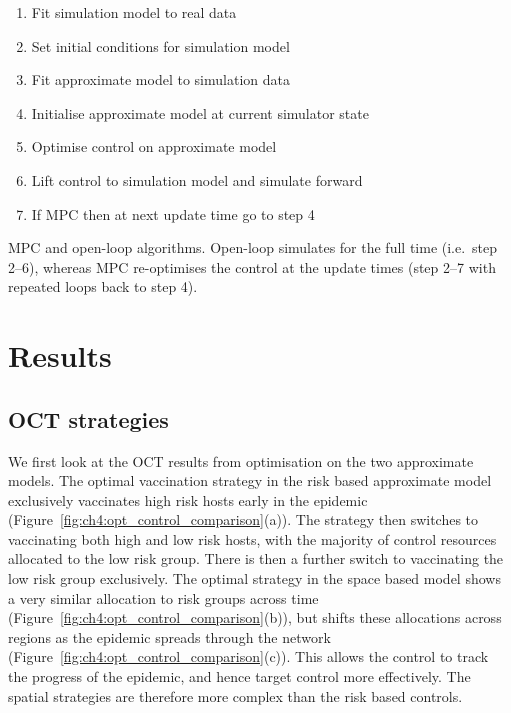 \begin{algorithm}
    \begin{enumerate}
        \item{}Fit simulation model to real data
        \item{}Set initial conditions for simulation model
        \item{}Fit approximate model to simulation data
        \item{}Initialise approximate model at current simulator state
        \item{}Optimise control on approximate model
        \item{}Lift control to simulation model and simulate forward
        \item{}If MPC then at next update time go to step 4
    \end{enumerate}
\caption{MPC and open-loop algorithms. Open-loop simulates for the full time (i.e.\ step 2--6), whereas MPC re-optimises the control at the update times (step 2--7 with repeated loops back to step 4).\label{alg:ch4:ol_mpc}}
\end{algorithm}

\FloatBarrier
\newpage
\section{Results\label{sec:ch4:Results}}

\subsection{OCT strategies}

We first look at the OCT results from optimisation on the two approximate models. The optimal vaccination strategy in the risk based approximate model exclusively vaccinates high risk hosts early in the epidemic (Figure~\ref{fig:ch4:opt_control_comparison}(a)). The strategy then switches to vaccinating both high and low risk hosts, with the majority of control resources allocated to the low risk group. There is then a further switch to vaccinating the low risk group exclusively. The optimal strategy in the space based model shows a very similar allocation to risk groups across time (Figure~\ref{fig:ch4:opt_control_comparison}(b)), but shifts these allocations across regions as the epidemic spreads through the network (Figure~\ref{fig:ch4:opt_control_comparison}(c)). This allows the control to track the progress of the epidemic, and hence target control more effectively. The spatial strategies are therefore more complex than the risk based controls.

